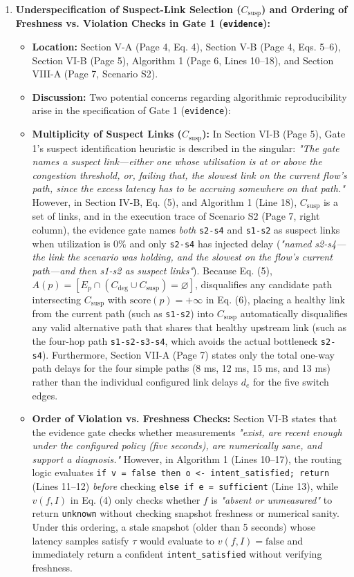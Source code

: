 \documentclass[11pt,a4paper]{article}
\begin{document}
\begin{enumerate}[leftmargin=1.6em,itemsep=3pt]
\item \textbf{Underspecification of Suspect-Link Selection ($C_{\text{susp}}$) and Ordering of Freshness vs. Violation Checks in Gate 1 (\texttt{evidence}):}
\begin{itemize}[leftmargin=1.8em,itemsep=2pt]
\item \textbf{Location:} Section V-A (Page 4, Eq. 4), Section V-B (Page 4, Eqs. 5–6), Section VI-B (Page 5), Algorithm 1 (Page 6, Lines 10–18), and Section VIII-A (Page 7, Scenario S2).
\item \textbf{Discussion:} Two potential concerns regarding algorithmic reproducibility arise in the specification of Gate 1 (\texttt{evidence}):
\item \textbf{Multiplicity of Suspect Links ($C_{\text{susp}}$):} In Section VI-B (Page 5), Gate 1's suspect identification heuristic is described in the singular: \emph{"The gate names a suspect link—either one whose utilisation is at or above the congestion threshold, or, failing that, the slowest link on the current flow's path, since the excess latency has to be accruing somewhere on that path."} However, in Section IV-B, Eq. (5), and Algorithm 1 (Line 18), $C_{\text{susp}}$ is a set of links, and in the execution trace of Scenario S2 (Page 7, right column), the evidence gate names \emph{both} \texttt{s2-s4} and \texttt{s1-s2} as suspect links when utilization is 0\% and only \texttt{s2-s4} has injected delay (\emph{"named s2-s4—the link the scenario was holding, and the slowest on the flow's current path—and then s1-s2 as suspect links"}). Because Eq. (5), $A(p) = [E_p \cap (C_{\text{deg}} \cup C_{\text{susp}}) = \varnothing]$, disqualifies any candidate path intersecting $C_{\text{susp}}$ with $\text{score}(p) = +\infty$ in Eq. (6), placing a healthy link from the current path (such as \texttt{s1-s2}) into $C_{\text{susp}}$ automatically disqualifies any valid alternative path that shares that healthy upstream link (such as the four-hop path \texttt{s1-s2-s3-s4}, which avoids the actual bottleneck \texttt{s2-s4}). Furthermore, Section VII-A (Page 7) states only the total one-way path delays for the four simple paths (8 ms, 12 ms, 15 ms, and 13 ms) rather than the individual configured link delays $d_e$ for the five switch edges.
\item \textbf{Order of Violation vs. Freshness Checks:} Section VI-B states that the evidence gate checks whether measurements \emph{"exist, are recent enough under the configured policy (five seconds), are numerically sane, and support a diagnosis."} However, in Algorithm 1 (Lines 10–17), the routing logic evaluates \texttt{if v = false then o <- intent\_satisfied; return} (Lines 11–12) \emph{before} checking \texttt{else if e = sufficient} (Line 13), while $v(f, I)$ in Eq. (4) only checks whether $f$ is \emph{"absent or unmeasured"} to return \texttt{unknown} without checking snapshot freshness or numerical sanity. Under this ordering, a stale snapshot (older than 5 seconds) whose latency samples satisfy $\tau$ would evaluate to $v(f, I) = \text{false}$ and immediately return a confident \texttt{intent\_satisfied} without verifying freshness.

\end{itemize}
\end{enumerate}
\end{document}

